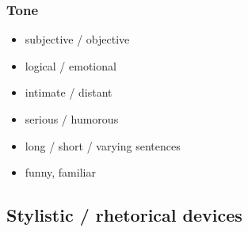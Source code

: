 \documentclass{article}
\begin{document}
	\subsubsection{Tone}
	\begin{itemize}
		\item subjective / objective
		\item logical / emotional
		\item intimate / distant
		\item serious / humorous
		\item long / short / varying sentences
		\item funny, familiar
	\end{itemize}

	\subsection{Stylistic / rhetorical devices}
\end{document}
